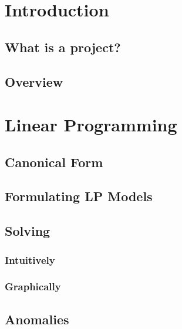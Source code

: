 \chapter{Introduction} %

    \section{What is a project?} %

    \section{Overview} %

\chapter{Linear Programming} %

    \section{Canonical Form} %

    \section{Formulating LP Models} %

    \section{Solving} %

        \subsection{Intuitively} %

        \subsection{Graphically} %

    \section{Anomalies} %

